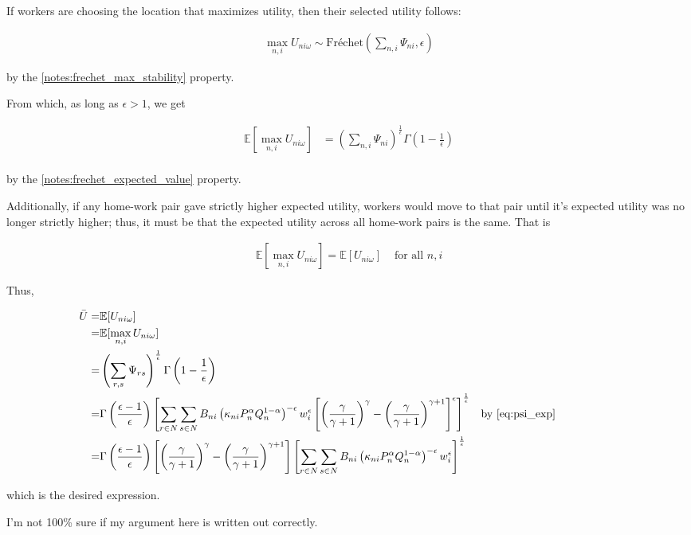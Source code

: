 \documentclass[10pt]{article}
\begin{document}
If workers are choosing the location that maximizes utility, 
then their selected utility follows:

\begin{align}
    \max_{n, i} U_{n i \omega} \sim \text{Fréchet}\left(\sum_{n, i} \Psi_{n i}, \epsilon\right)
\end{align}

by the \autoref{notes:frechet_max_stability} property.

From which, as long as $\epsilon > 1$, we get

\begin{align}
    \mathbb{E}[ \max_{n, i} U_{n i \omega}] &= \left(\sum_{n, i} \Psi_{n i}\right)^{\frac{1}{\epsilon}} \Gamma\left(1-\frac{1}{\epsilon}\right) \\
\end{align}

by the \autoref{notes:frechet_expected_value} property.

Additionally, if any home-work pair gave strictly higher 
expected utility, workers would move to that pair until 
it's expected utility was no longer strictly higher; thus, 
it must be that the expected utility across 
all home-work pairs is the same. 
That is

\begin{align}
    \mathbb{E}[ \max_{n, i} U_{n i \omega}] = \mathbb{E}[U_{ni \omega}] & \text{ for all } n, i
\end{align}

Thus, 

\begin{align}
    \bar{U} = &\mathbb{E}[U_{n i \omega}]  \\ 
    = & \mathbb{E}[ \max_{n, i} U_{n i \omega}] \\
    = &\left(\sum_{r, s} \Psi_{r s}\right)^{\frac{1}{\epsilon}} \Gamma\left(1-\frac{1}{\epsilon}\right) \\
    = &\Gamma\left(\frac{\epsilon-1}{\epsilon}\right)\left[\sum_{r \in N} \sum_{s \in N} B_{n i}\left(\kappa_{n i} P_n^\alpha Q_n^{1-\alpha}\right)^{-\epsilon} w_i^\epsilon \left[\left(\frac{\gamma}{\gamma+1}\right)^\gamma-\left(\frac{\gamma}{\gamma+1}\right)^{\gamma+1}\right]^\epsilon\right]^{\frac{1}{\epsilon}} && \parbox[t]{4cm}{\raggedright by \eqref{eq:psi_exp}} \\
    = &\Gamma\left(\frac{\epsilon-1}{\epsilon}\right) \left[\left(\frac{\gamma}{\gamma+1}\right)^\gamma-\left(\frac{\gamma}{\gamma+1}\right)^{\gamma+1}\right] \left[\sum_{r \in N} \sum_{s \in N} B_{n i}\left(\kappa_{n i} P_n^\alpha Q_n^{1-\alpha}\right)^{-\epsilon} w_i^\epsilon\right]^{\frac{1}{\epsilon}} 
\end{align}

which is the desired expression.

\begin{questions}[Uncertainty]
    I'm not 100\% sure if my argument here is written out correctly.
\end{questions}
\end{document}
